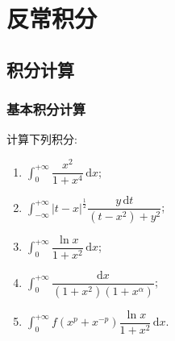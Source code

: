 \documentclass[../../数学分析培优讲义(答案版).tex]{subfiles}
\begin{document}
\setcounter{chapter}{6}
\pagestyle{fancy}

\chapter{反常积分}

\section{积分计算}

\subsection{基本积分计算}

\begin{example}
计算下列积分:
\begin{enumerate}[label=(\arabic*)]
    \item $\displaystyle\int_0^{+\infty}\dfrac{x^2}{1+x^4}\,\mathrm{d}x$;
    \item $\displaystyle\int_{-\infty}^{+\infty}|t-x|^{\frac{1}{2}}
    \dfrac{y\,\mathrm{d}t}{(t-x^2)+y^2}$;
    \item $\displaystyle\int_0^{+\infty}\dfrac{\ln x}{1+x^2}\,\mathrm{d}x$;
    \item $\displaystyle\int_0^{+\infty}\dfrac{\mathrm{d}x}{(1+x^2)(1+x^\alpha)}$;
    \item $\displaystyle\int_0^{+\infty}f(x^p+x^{-p})\dfrac{\ln x}{1+x^2}\,\mathrm{d}x$.
\end{enumerate}
\end{example}
\end{document}
